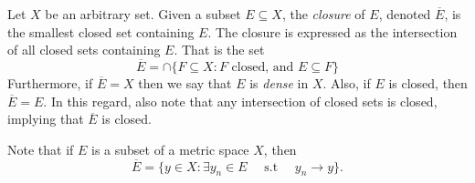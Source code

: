\documentclass[../thesis.tex]{subfiles}
\begin{document}
\begin{definition}[Closure]\label{def:closure}
    Let $X$ be an arbitrary set. Given a subset $E \subseteq X$, the \emph{closure} of $E$, denoted $\overline{E}$, is the smallest closed set containing $E$. The closure is expressed as the intersection of all closed sets containing $E$. That is the set
    \begin{equation*}
        \overline{E} = \cap \{ F \subseteq X : F \text{ closed, and } E \subseteq F\}
    \end{equation*}
    Furthermore, if $\overline{E} = X$ then we say that $E$ is \emph{dense} in $X$. Also, if $E$ is closed, then$\overline{E}=E$. In this regard, also note that any intersection of closed sets is closed, implying that $\overline{E}$ is closed.
\end{definition}
\begin{remark}
    Note that if $E$ is a subset of a metric space $X$, then
    \begin{equation*}
        \overline{E} = \{ y \in X : \exists y_n\in E \quad \text{ s.t }\quad y_n \longrightarrow y\}.
    \end{equation*}
\end{remark}
\end{document}
